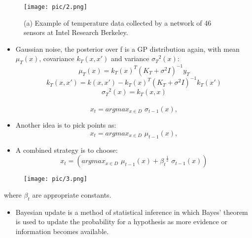\documentclass[10pt]{beamer}
\begin{document}
\begin{frame}
    \begin{figure}
        \texttt{[image: pic/2.png]}
        \caption{(a) Example of temperature data collected by a network of 46 sensors at Intel Research Berkeley.}
    \end{figure}
\end{frame}

\begin{frame}
    \begin{itemize}
        \item Gaussian noise, the posterior over f is a GP distribution again, with mean ${\mu_{T}(x)}$, covariance ${k_{T}(x,x')}$ and variance ${{\sigma_{T}}^2(x)}$:
        \begin{equation}
            \mu_{T}(x)=k_{T}(x)^{T}(K_{T}+\sigma^2I)^{-1}y_{T}
        \end{equation}
        \begin{equation}
            k_{T}(x,x')=k(x,x')-k_{T}(x)^{T}(K_{T}+\sigma^2I)^{-1}k_{T}(x')
        \end{equation}
        \begin{equation}
            {\sigma_{T}}^2(x)=k_{T}(x,x)
        \end{equation}\\
            \begin{equation}
                x_{t}=argmax  _{x\in D} \,\, \sigma_{t-1}(x),
            \end{equation}
        \item Another idea is to pick points as:
            \begin{equation}
                x_{t}=argmax _{x\in D} \,\, \mu_{t-1}(x),
            \end{equation}
        \item A  combined strategy is to choose:
            \begin{equation}
                x_{t}=(argmax_{x\in D} \,\, \mu_{t-1}(x) +{\beta_{t}}^{\frac{1}{2}} \,\, \sigma_{t-1}(x))
            \end{equation}
    \end{itemize}
\end{frame}

\begin{frame}
    \begin{figure}
        \texttt{[image: pic/3.png]}
    \end{figure}
    where ${\beta_{t}}$ are appropriate constants.
    \begin{itemize}
        \item Bayesian update is a method of statistical inference in which Bayes' theorem is used to update the probability for a hypothesis as more evidence or information becomes available.
    \end{itemize}
\end{frame}
\end{document}
